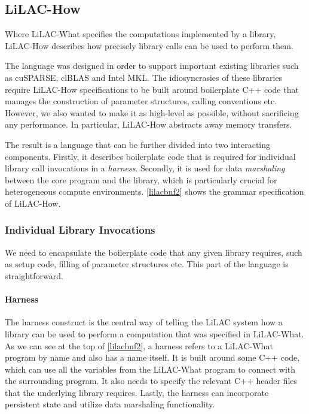 \subsection{LiLAC-How}
\label{sec:lilachow}
Where LiLAC-What specifies the computations implemented by a library, LiLAC-How
describes how precisely library calls can be used to perform them.

The language was designed in order to support important existing libraries
such as cuSPARSE, clBLAS and Intel MKL.
The idiosyncrasies of these libraries require LiLAC-How specifications to be
built around boilerplate C++ code that manages the
construction of parameter structures, calling conventions etc.
However, we also wanted to make it as high-level as possible,
without sacrificing any performance.
In particular, LiLAC-How abstracts away memory transfers.

The result is a language that can be further divided into two interacting
components.
Firstly, it describes boilerplate code that is required for individual library
call invocations in a {\em harness}.
Secondly, it is used for data {\em marshaling} between the core program and the
library, which is particularly crucial for heterogeneous compute environments.
\autoref{lilacbnf2} shows the grammar specification of LiLAC-How.

\subsubsection{Individual Library Invocations}
We need to encapsulate the boilerplate code that any given library requires,
such as setup code, filling of parameter structures etc.
This part of the language is straightforward.

\paragraph{Harness}
The harness construct is the central way of telling the LiLAC system how a
library can be used to perform a computation that was specified in LiLAC-What.
As we can see at the top of \autoref{lilacbnf2}, a harness refers to a
LiLAC-What program by name and also has a name itself.
It is built around some C++ code, which can use all the variables from the
LiLAC-What program to connect with the surrounding program.
It also needs to specify the relevant C++ header files
that the underlying library requires.
Lastly, the harness can incorporate persistent state and utilize data
marshaling functionality.

